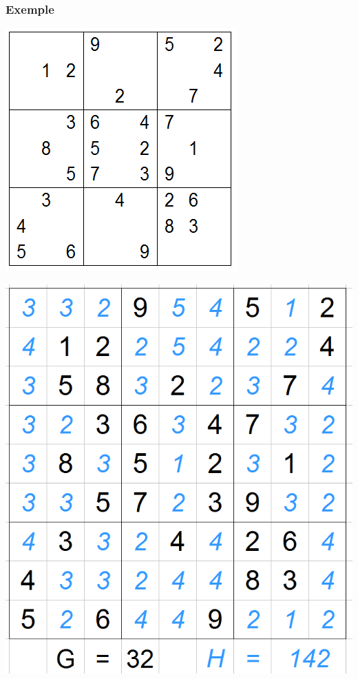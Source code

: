 \begin{frame}
\frametitle{Exemple}


\begin{minipage}{.45\textwidth}

\includegraphics[scale=0.5]{images/ASTARExample/ini.png}


\end{minipage} \hfill
\begin{minipage}{.45\textwidth}

\includegraphics[scale=0.3]{images/ASTARExample/ini_H.png}

\end{minipage}

\end{frame}


